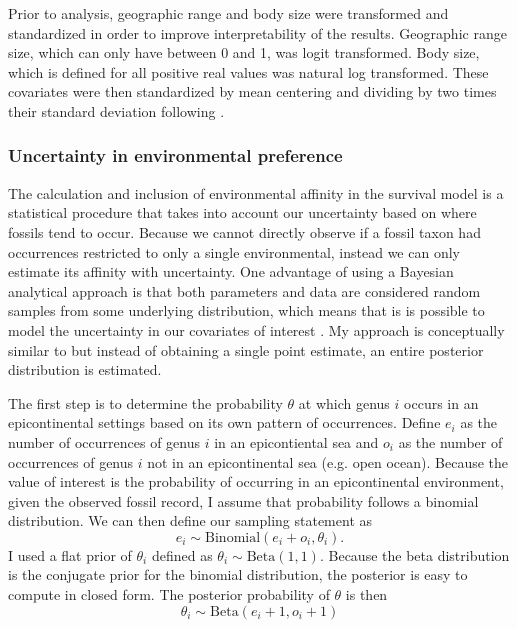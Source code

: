 \documentclass[12pt,letterpaper]{article}
\begin{document}
Prior to analysis, geographic range and body size were transformed and standardized in order to improve interpretability of the results. Geographic range size, which can only have between 0 and 1, was logit transformed. Body size, which is defined for all positive real values was natural log transformed. These covariates were then standardized by mean centering and dividing by two times their standard deviation following \citet{Gelman2007}.

\subsubsection{Uncertainty in environmental preference}
The calculation and inclusion of environmental affinity in the survival model is a statistical procedure that takes into account our uncertainty based on where fossils tend to occur. Because we cannot directly observe if a fossil taxon had occurrences restricted to only a single environmental, instead we can only estimate its affinity with uncertainty. One advantage of using a Bayesian analytical approach is that both parameters and data are considered random samples from some underlying distribution, which means that is is possible to model the uncertainty in our covariates of interest \citep{Gelman2013d}. My approach is conceptually similar to \citet{Simpson2009} but instead of obtaining a single point estimate, an entire posterior distribution is estimated.

The first step is to determine the probability \(\theta\) at which genus \(i\) occurs in an epicontinental settings based on its own pattern of occurrences. Define \(e_{i}\) as the number of occurrences of genus \(i\) in an epicontiental sea and \(o_{i}\) as the number of occurrences of genus \(i\) not in an epicontinental sea (e.g. open ocean). Because the value of interest is the probability of occurring in an epicontinental environment, given the observed fossil record, I assume that probability follows a binomial distribution. We can then define our sampling statement as
\begin{equation}
  e_{i} \sim \mathrm{Binomial}(e_{i} + o_{i}, \theta_{i}).
  \label{eq:epi_lik}
\end{equation}
I used a flat prior of \(\theta_{i}\) defined as \(\theta_{i} \sim \mathrm{Beta}(1, 1)\). Because the beta distribution is the conjugate prior for the binomial distribution, the posterior is easy to compute in closed form. The posterior probability of \(\theta\) is then 
\begin{equation}
  \theta_{i} \sim \mathrm{Beta}(e_{i} + 1, o_{i} + 1)
  \label{eq:epi_post}
\end{equation}
\end{document}

